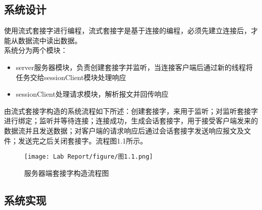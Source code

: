 \subsection{系统设计}
\hspace*{2em}使用流式套接字进行编程，流式套接字是基于连接的编程，必须先建立连接后，才能从数据流中读出数据。\\
\hspace*{2em}系统分为两个模块：
\begin{itemize}
  \item server服务器模块，负责创建套接字并监听，当连接客户端后通过新的线程将任务交给sessionClient模块处理响应
  \item sessionClient处理请求模块，解析报文并回传响应
\end{itemize}
\hspace*{2em}由流式套接字构造的系统流程如下所述：创建套接字，来用于监听；对监听套接字进行绑定；监听并等待连接；连接成功，生成会话套接字，用于接受客户端发来的数据流并且发送数据；对客户端的请求响应后通过会话套接字发送响应报文及文件；发送完之后关闭套接字。流程图1.1所示。\\

\begin{figure}[htbp] %
\centering %
\texttt{[image: Lab Report/figure/图1.1.png]}
\caption{服务器端套接字构造流程图} %
\end{figure}

\subsection{系统实现}
